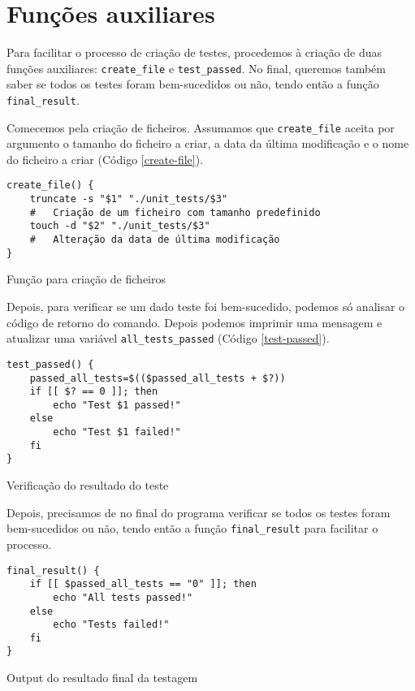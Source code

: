 \section{Funções auxiliares}

Para facilitar o processo de criação de testes, procedemos à criação de duas funções auxiliares: \verb|create_file| e
\verb|test_passed|. No final, queremos também saber se todos os testes foram bem-sucedidos ou não, tendo então a função
\verb|final_result|.

Comecemos pela criação de ficheiros. Assumamos que \verb|create_file| aceita por argumento o tamanho do ficheiro a
criar, a data da última modificação e o nome do ficheiro a criar (Código \ref{create-file}).
\begin{listing}[H]
\begin{verbatim}
create_file() {
    truncate -s "$1" "./unit_tests/$3"
    #   Criação de um ficheiro com tamanho predefinido
    touch -d "$2" "./unit_tests/$3"
    #   Alteração da data de última modificação
}
\end{verbatim}
\caption{Função para criação de ficheiros}
\label{create-file}
\end{listing}

Depois, para verificar se um dado teste foi bem-sucedido, podemos só analisar o código de retorno do comando. Depois
podemos imprimir uma mensagem e atualizar uma variável \verb|all_tests_passed| (Código \ref{test-passed}).

\begin{listing}[H]
\begin{verbatim}
test_passed() {
    passed_all_tests=$(($passed_all_tests + $?))
    if [[ $? == 0 ]]; then
        echo "Test $1 passed!"
    else
        echo "Test $1 failed!"
    fi
}
\end{verbatim}
\caption{Verificação do resultado do teste}
\label{test-passed}
\end{listing}
Depois, precisamos de no final do programa verificar se todos os testes foram bem-sucedidos ou não, tendo então a função
\verb|final_result| para facilitar o processo.

\begin{listing}[H]
\begin{verbatim}
final_result() {
    if [[ $passed_all_tests == "0" ]]; then
        echo "All tests passed!"
    else
        echo "Tests failed!"
    fi
}
\end{verbatim}
\caption{Output do resultado final da testagem}
\end{listing}

